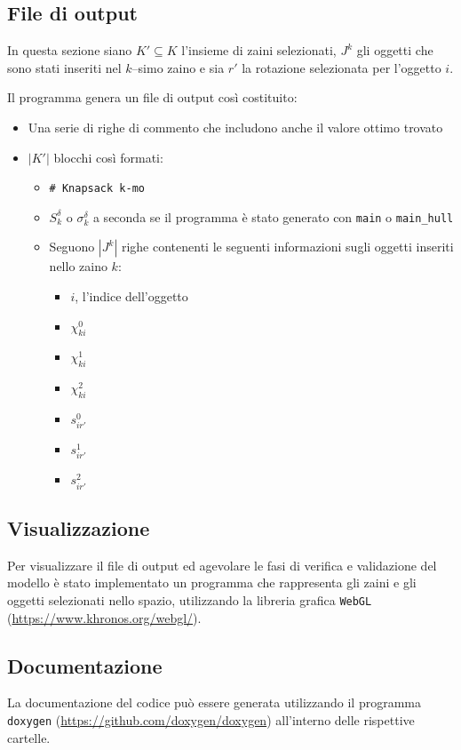 \subsection{File di output}
In questa sezione siano $K' \subseteq K$ l'insieme di zaini selezionati, 
$J^k$ gli oggetti che sono stati inseriti nel $k$--simo zaino e sia $r'$ la 
rotazione selezionata per l'oggetto $i$.


Il programma genera un file di output così costituito:
\begin{itemize}
	\item Una serie di righe di commento che includono anche il valore ottimo 
	trovato
	\item $|K'|$ blocchi così formati:
		\begin{itemize}
			\item \verb|# Knapsack k-mo|
			\item $S_k^\delta$ o $\sigma_k^\delta$ a seconda se il programma è 
			stato generato con \verb|main| o \verb|main_hull|
			\item Seguono $|J^k|$ righe contenenti le seguenti informazioni 
			sugli oggetti inseriti nello zaino $k$:
			\begin{itemize}
				\item $i$, l'indice dell'oggetto
				\item $\chi_{ki}^0$
				\item $\chi_{ki}^1$
				\item $\chi_{ki}^2$
				\item $s_{ir'}^0$
				\item $s_{ir'}^1$
				\item $s_{ir'}^2$
			\end{itemize}
		\end{itemize}
\end{itemize}






\subsection{Visualizzazione}
Per visualizzare il file di output ed agevolare le fasi di verifica e 
validazione del modello è stato implementato un programma che rappresenta gli 
zaini e gli oggetti selezionati nello spazio, utilizzando la libreria grafica 
\verb|WebGL| (\url{https://www.khronos.org/webgl/}).

\subsection{Documentazione}
La documentazione del codice può essere generata utilizzando il programma 
\verb|doxygen| (\url{https://github.com/doxygen/doxygen})
all'interno delle rispettive cartelle.

